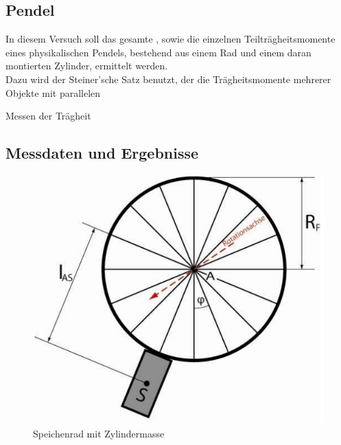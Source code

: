 \documentclass[12pt,a4paper]{article}
\begin{document}
\begin{multicols}{2}
\section{Pendel}
In diesem Versuch soll das gesamte , sowie die einzelnen Teilträgheitsmomente eines physikalischen Pendels, bestehend aus einem Rad und einem daran montierten Zylinder, ermittelt werden.\\
Dazu wird der Steiner'sche Satz benutzt, der die Trägheitsmomente mehrerer Objekte mit parallelen 

Messen der Trägheit


\subsection{Messdaten und Ergebnisse}

\begin{figure}[H]
	\centering
  	\includegraphics[scale=0.45]{./figure/speichenrad.png}
	\caption{Speichenrad mit Zylindermasse}
	\label{fig:rad}
\end{figure}

\end{multicols}
\end{document}
